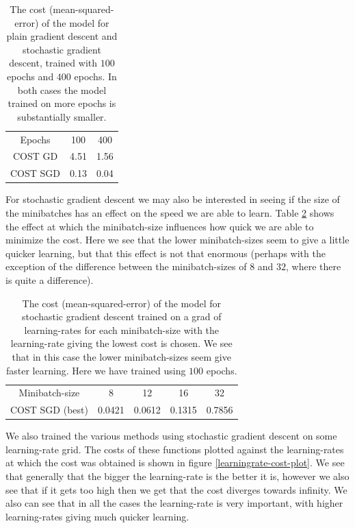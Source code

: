 \documentclass{article}
\begin{document}
\begin{table}
      \centering
      \begin{tabular}{| c | c | c |}
            Epochs   & 100  & 400  \\
            COST GD  & 4.51 & 1.56 \\
            COST SGD & 0.13 & 0.04
      \end{tabular}
      \caption{The cost (mean-squared-error) of the model for plain gradient
            descent and stochastic gradient descent, trained with $100$ epochs and
            $400$ epochs. In both cases the model trained on more epochs is
            substantially smaller.}
      \label{epochs-varying}
\end{table}

For stochastic gradient descent we may also be interested in seeing if the size
of the minibatches has an effect on the speed we are able to learn. Table
\ref{minibatchsize-varying} shows the effect at which the minibatch-size
influences how quick we are able to minimize the cost. Here we see that the
lower minibatch-sizes seem to give a little quicker learning, but that  this
effect is not that enormous (perhaps with the exception of the difference
between the minibatch-sizes of $8$ and $32$, where there is quite a difference).

\begin{table}
      \centering
      \begin{tabular}{| c | c | c | c | c |}
            Minibatch-size  & 8      & 12     & 16     & 32     \\
            COST SGD (best) & 0.0421 & 0.0612 & 0.1315 & 0.7856
      \end{tabular}
      \caption{The cost (mean-squared-error) of the model for stochastic
            gradient descent trained on a grad of learning-rates for each
            minibatch-size with the learning-rate giving the lowest cost is chosen. We
            see that in this case the lower minibatch-sizes seem give faster
            learning. Here we have trained using $100$ epochs.}
      \label{minibatchsize-varying}
\end{table}

We also trained the various methods using stochastic gradient descent on some
learning-rate grid. The costs of these functions plotted against the
learning-rates at which the cost was obtained is shown in figure
\ref{learningrate-cost-plot}. We see that generally that the bigger the
learning-rate is the better it is, however we also see that if it gets too high
then we get that the cost diverges towards infinity. We also can see that in all
the cases the learning-rate is very important, with higher learning-rates giving
much quicker learning.
\end{document}
